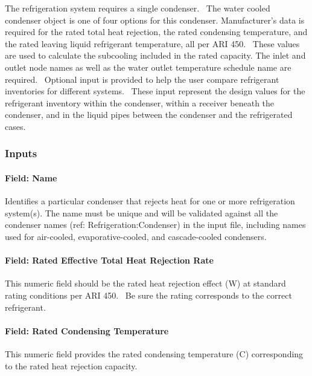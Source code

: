 The refrigeration system requires a single condenser.~ The water cooled condenser object is one of four options for this condenser. Manufacturer's data is required for the rated total heat rejection, the rated condensing temperature, and the rated leaving liquid refrigerant temperature, all per ARI 450.~ These values are used to calculate the subcooling included in the rated capacity. The inlet and outlet node names as well as the water outlet temperature schedule name are required.~ Optional input is provided to help the user compare refrigerant inventories for different systems.~ These input represent the design values for the refrigerant inventory within the condenser, within a receiver beneath the condenser, and in the liquid pipes between the condenser and the refrigerated cases.

\subsubsection{Inputs}\label{inputs-10-015}

\paragraph{Field: Name}\label{field-name-11-011}

Identifies a particular condenser that rejects heat for one or more refrigeration system(s). The name must be unique and will be validated against all the condenser names (ref: Refrigeration:Condenser) in the input file, including names used for air-cooled, evaporative-cooled, and cascade-cooled condensers.

\paragraph{Field: Rated Effective Total Heat Rejection Rate}\label{field-rated-effective-total-heat-rejection-rate-1}

This numeric field should be the rated heat rejection effect (W) at standard rating conditions per ARI 450.~ Be sure the rating corresponds to the correct refrigerant.

\paragraph{Field: Rated Condensing Temperature}\label{field-rated-condensing-temperature}

This numeric field provides the rated condensing temperature (C) corresponding to the rated heat rejection capacity.

